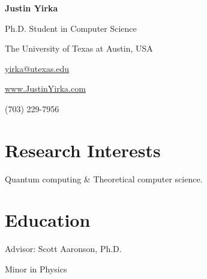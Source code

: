 \documentclass[11pt,letterpaper,serif]{moderncv}
\begin{document}
	
	
\thispagestyle{firstpage}

\begin{center}
	{\huge\textbf{Justin Yirka}}
	
	Ph.D. Student in Computer Science
	
	The University of Texas at Austin, USA
	
	\vspace{\baselineskip}
	
	\href{mailto:yirka@utexas.edu}{yirka@utexas.edu}
	
	
	\url{www.JustinYirka.com}	

	(703) 229-7956
\end{center}


\setlength{\parskip}{0.4em}

\section{Research Interests}
Quantum computing \& Theoretical computer science.


\section{Education}
{
	\normalsize
	\begin{adjustwidth}{.25in}{}
		 Advisor: Scott Aaronson, Ph.D.
	\end{adjustwidth}
}

\vspace{-\baselineskip}\vspace{-2\parskip}
{%
}
{
	\begin{adjustwidth}{.25in}{}
		Minor in Physics %
	\end{adjustwidth}
}
\end{document}
